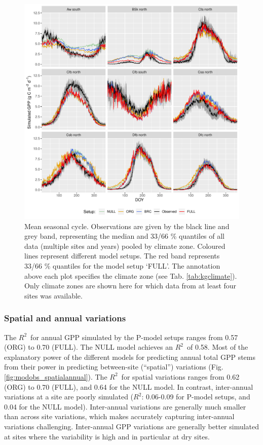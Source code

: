 \documentclass{myreport}
\newcommand{\rsq}{$R^2$}
\begin{document}
 \begin{figure}[!ht]
\includegraphics[width=\textwidth]{fig/meandoy_byzone.pdf}
\caption{Mean seasonal cycle. Observations are given by the black line and grey band, representing the median and 33/66 \% quantiles of all data (multiple sites and years) pooled by climate zone. Coloured lines represent different model setups. The red band represents 33/66 \% quantiles for the model setup `FULL'. The annotation above each plot specifies the climate zone (see Tab. \ref{tab:kgclimate}). Only climate zones are shown here for which data from at least four sites was available.}
    \label{fig:season}
\end{figure}

\clearpage

\subsubsection{Spatial and annual variations}

The \rsq\ for annual GPP simulated by the P-model setups ranges from 0.57 (ORG) to 0.70 (FULL). The NULL model achieves an \rsq\ of 0.58. Most of the explanatory power of the different models for predicting annual total GPP stems from their power in predicting between-site (``spatial'') variations (Fig. \ref{fig:modobs_spatialannual}). The \rsq\ for spatial variations ranges from 0.62 (ORG) to 0.70 (FULL), and 0.64 for the NULL model. In contrast, inter-annual  variations at a site are poorly simulated (\rsq : 0.06-0.09 for P-model setups, and 0.04 for the NULL model). Inter-annual variations are generally much smaller than across site variations, which makes accurately capturing inter-annual variations challenging. Inter-annual GPP variations are generally better simulated at sites where the variability is high and in particular at dry sites. 
\end{document}
